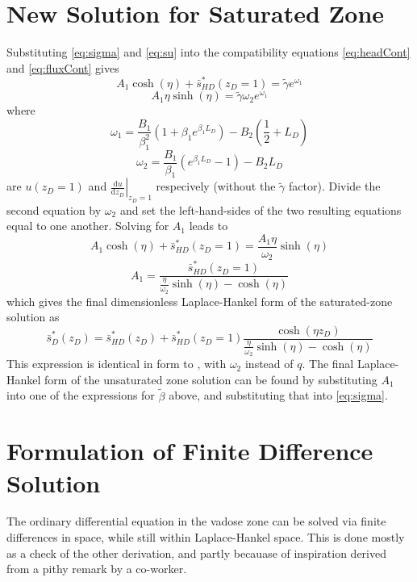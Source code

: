 \documentclass[12pt,letterpaper]{article}
\begin{document}
\section{New Solution for Saturated Zone}
Substituting \eqref{eq:sigma} and \eqref{eq:su} into the compatibility
equations \eqref{eq:headCont} and \eqref{eq:fluxCont} gives
\begin{equation}\nonumber
  A_1 \cosh(\eta) + \bar{s}_{HD}^{\ast}(z_D=1) = \tilde{\gamma}e^{\omega_1}
\end{equation}
\begin{equation}\nonumber
 A_1 \eta  \sinh(\eta)  = \tilde{\gamma} \omega_2 e^{\omega_1}
\end{equation}
where 
\begin{equation}\nonumber
 \omega_1 = \frac{B_1}{\beta_1^2} \left( 1 + \beta_1 e^{\beta_1
        L_D} \right) - B_2 \left( \frac{1}{2}
     +L_D  \right) 
\end{equation}
\begin{equation}
  \label{eq:omega2}
  \omega_2 = \frac{B_1}{\beta_1} \left( e^{\beta_1 L_D} -1 \right) - B_2 L_D 
\end{equation}
are $u(z_D=1)$ and $\left. \frac{\mathrm{d} u}{\mathrm{d}z_D} \right|_{z_D=1}$
respecively (without the $\tilde\gamma$ factor).
Divide the second equation by $\omega_2$ and set the left-hand-sides of the two resulting equations equal to one another.  Solving for $A_1$ leads to
\begin{equation}\nonumber
A_1 \cosh(\eta) + \bar{s}_{HD}^{\ast}(z_D=1) = \frac{A_1  \eta}{\omega_2}  \sinh(\eta) 
\end{equation}
\begin{equation}\nonumber
 A_1 = \frac{\bar{s}_{HD}^{\ast}(z_D=1)}{\frac{\eta}{\omega_2}  \sinh(\eta) - \cosh(\eta)}
\end{equation}
which gives the final dimensionless Laplace-Hankel form of the saturated-zone solution as
\begin{equation}\nonumber
 \bar{s}_D^{\ast}(z_D)  = \bar{s}_{HD}^{\ast}(z_D) + \bar{s}_{HD}^{\ast}(z_D=1) \frac{\cosh(\eta z_D)}{\frac{\eta}{\omega_2}  \sinh(\eta) - \cosh(\eta)}
\end{equation} 
This expression is identical in form to \cite[eqn.\ C17]{mishra10},
with $\omega_2$ instead of $q$.  The final Laplace-Hankel form of the
unsaturated zone solution can be found by substituting $A_1$ into one
of the expressions for $\tilde\beta$ above, and substituting that into
\eqref{eq:sigma}.

\section{Formulation of Finite Difference Solution}
The ordinary differential equation in the vadose zone can be solved
via finite differences in space, while still within Laplace-Hankel
space.  This is done mostly as a check of the other derivation, and
partly becauase of inspiration derived from a pithy remark by a co-worker.
\end{document}
